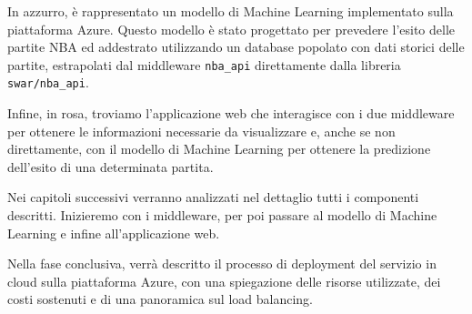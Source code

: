 In azzurro, è rappresentato un modello di Machine Learning implementato sulla piattaforma Azure. Questo modello è stato progettato per prevedere l'esito delle partite NBA ed addestrato utilizzando un database popolato con dati storici delle partite, estrapolati dal middleware \texttt{nba\_api} direttamente dalla libreria \texttt{swar/nba\_api}.

Infine, in rosa, troviamo l'applicazione web che interagisce con i due middleware per ottenere le informazioni necessarie da visualizzare e, anche se non direttamente, con il modello di Machine Learning per ottenere la predizione dell'esito di una determinata partita.

\vspace{+20px}

Nei capitoli successivi verranno analizzati nel dettaglio tutti i componenti descritti. Inizieremo con i middleware, per poi passare al modello di Machine Learning e infine all'applicazione web.

Nella fase conclusiva, verrà descritto il processo di deployment del servizio in cloud sulla piattaforma Azure, con una spiegazione delle risorse utilizzate, dei costi sostenuti e di una panoramica sul load balancing.
